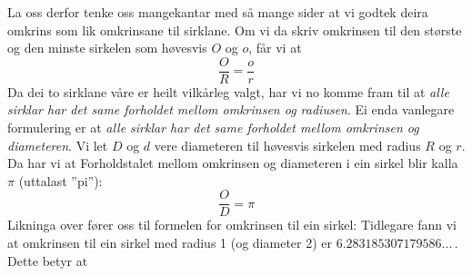 {La oss derfor tenke oss mangekantar med så mange sider at vi godtek deira omkrins som lik omkrinsane til sirklane. Om vi da skriv omkrinsen til den største og den minste sirkelen som høvesvis $ O $ og $ o $, får vi at
\[ \frac{O}{R}=\frac{o}{r} \]
Da dei to sirklane våre er heilt vilkårleg valgt, har vi no komme fram til at \textit{alle sirklar har det same forholdet mellom omkrinsen og radiusen}. Ei enda vanlegare formulering er at \textit{alle sirklar har det same forholdet mellom omkrinsen og diameteren}. Vi let $ D $ og $ d $ vere diameteren til høvesvis sirkelen med radius $ R $ og $ r $. Da har vi at
Forholdstalet mellom omkrinsen og diameteren i ein sirkel blir kalla $ \pi $ \index{$ \pi $}(uttalast ''pi''):
\[ \frac{O}{D}=\pi \]
Likninga over fører oss til formelen for omkrinsen til ein sirkel:
Tidlegare fann vi at omkrinsen til ein sirkel med radius 1 (og diameter 2) er $ 6.283185307179586... $\,. Dette betyr at
} 
\newpage
{} \regv

